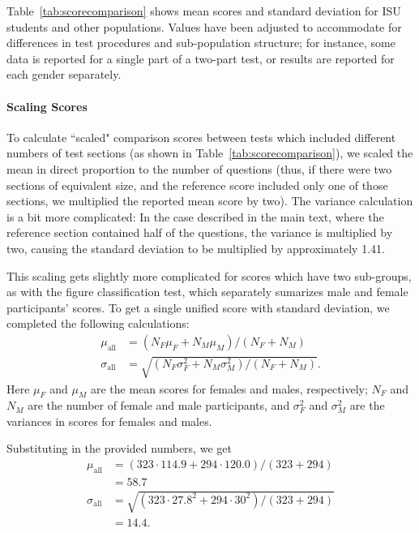 \documentclass[11pt]{isuthesis}\usepackage[]{graphicx}\usepackage[]{color}
\begin{document}
Table~\ref{tab:scorecomparison} shows mean scores and standard deviation for ISU students and other populations. Values have been adjusted to accommodate for differences in test procedures and sub-population structure; for instance,  some data is reported for a single part of a two-part test, or results are reported for each gender separately. 

\paragraph{Scaling Scores}\label{app:ScoreAdj}
To calculate ``scaled" comparison scores between tests which included different numbers of test sections (as shown in Table~\ref{tab:scorecomparison}), we scaled the mean in direct proportion to the number of questions (thus, if there were two sections of equivalent size, and the reference score included only one of those sections, we multiplied the reported mean score by two). The variance calculation is a bit more complicated: In the case described in the main text, where the reference section contained half of the questions, the variance is multiplied by two, causing the standard deviation to be multiplied by approximately 1.41. 

This scaling gets slightly more complicated for scores which have two sub-groups, as with the figure classification test, which separately sumarizes male and female participants' scores. 
To get a single unified score with standard deviation, we completed the following calculations: 
\begin{align}
\mu_{\text{all}} &= (N_F\mu_{F} + N_M\mu_{M})/(N_F + N_M)\\
\sigma_{\text{all}} &= \sqrt{\left(N_F\sigma_F^2 + N_M\sigma_M^2\right)/(N_F + N_M)}.
\end{align}
Here $\mu_F$ and $\mu_M$ are the mean scores for females and males, respectively; $N_F$ and $N_M$ are the number of female and male participants, and $\sigma_F^2$ and $\sigma_M^2$ are the variances in scores for females and males.

Substituting in the provided numbers, we get
\begin{align*}
\mu_{\text{all}} &= \left(323\!\cdot\!114.9\! +\! 294\!\cdot\!120.0\right)/(323\!+\!294) \\
& = 58.7\\
\sigma_{\text{all}} &= \sqrt{\left(323 \cdot 27.8^2 \!+\! 294 \cdot 30^2\right)/(323\!+\!294)} \\
& = 14.4.
\end{align*}
\end{document}
